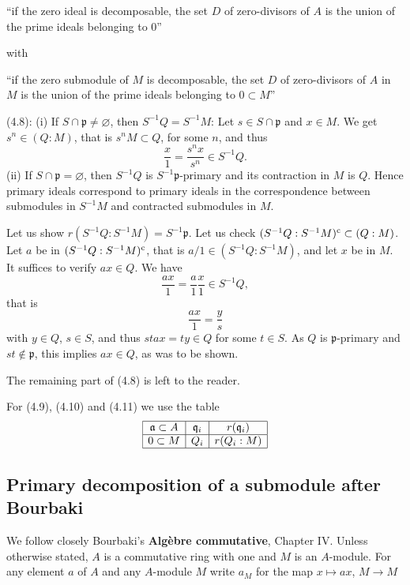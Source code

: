 \documentclass[parskip=half,fontsize=12pt]{scrartcl}%
\newcommand{\mf}{\mathfrak}
\newcommand{\aaa}{\mf a}
\newcommand{\ppp}{\mf p}
\newcommand{\qqq}{\mf q}
\begin{document}
``if the zero ideal is decomposable, the set $D$ of zero-divisors of $A$ is the union of the prime ideals belonging to $0$'' 

with 

``if the zero submodule of $M$ is decomposable, the set $D$ of zero-divisors of $A$ in $M$ is the union of the prime ideals belonging to $0\subset M$''

(4.8): (i) If $S\cap\ppp\ne\varnothing$, then $S^{-1}Q=S^{-1}M$: Let $s\in S\cap\ppp$ and $x\in M$. We get $s^n\in(Q:M)$, that is $s^nM\subset Q$, for some $n$, and thus 
$$
\frac x1=\frac{s^nx}{s^n}\in S^{-1}Q.
$$ 
(ii) If $S\cap\ppp=\varnothing$, then $S^{-1}Q$ is $S^{-1}\ppp$-primary and its contraction in $M$ is $Q$. Hence primary ideals correspond to primary ideals in the correspondence between submodules in $S^{-1}M$ and contracted submodules in $M$.

Let us show $r(S^{-1}Q:S^{-1}M)=S^{-1}\ppp$. Let us check $(S^{-1}Q:S^{-1}M)^{\text c}\subset (Q:M)$. Let $a$ be in $(S^{-1}Q:S^{-1}M)^{\text c}$, that is $a/1\in (S^{-1}Q:S^{-1}M)$, and let $x$ be in $M$. It suffices to verify $ax\in Q$. We have  
$$
\frac{ax}1=\frac a1\frac x1\in S^{-1}Q,
$$ 
that is 
$$
\frac{ax}1=\frac ys
$$ 
with $y\in Q$, $s\in S$, and thus $stax=ty\in Q$ for some $t\in S$. As $Q$ is $\ppp$-primary and $st\notin\ppp$, this implies $ax\in Q$, as was to be shown. 

The remaining part of (4.8) is left to the reader.

For (4.9), (4.10) and (4.11) we use the table
$$
\begin{array}{|c|c|c|}\hline
\aaa\subset A&\qqq_i&r(\qqq_i)\\ \hline 
0\subset M&Q_i&r(Q_i:M)\\ \hline
\end{array}
$$ 

\subsection{Primary decomposition of a submodule after Bourbaki}%


We follow closely Bourbaki's \textbf{Algèbre commutative}, Chapter IV. Unless otherwise stated, $A$ is a commutative ring with one and $M$ is an $A$-module. For any element $a$ of $A$ and any $A$-module $M$ write $a_M$ for the map $x\mapsto ax$, $M\to M$
\end{document}
